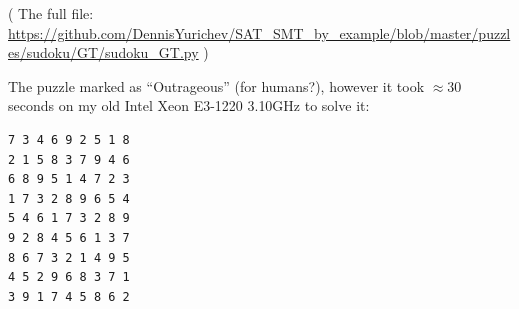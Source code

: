 ( The full file: \url{https://github.com/DennisYurichev/SAT_SMT_by_example/blob/master/puzzles/sudoku/GT/sudoku_GT.py} )

The puzzle marked as ``Outrageous'' (for humans?), however it took $\approx 30$ seconds
on my old Intel Xeon E3-1220 3.10GHz to solve it:

\begin{lstlisting}
7 3 4 6 9 2 5 1 8
2 1 5 8 3 7 9 4 6
6 8 9 5 1 4 7 2 3
1 7 3 2 8 9 6 5 4
5 4 6 1 7 3 2 8 9
9 2 8 4 5 6 1 3 7
8 6 7 3 2 1 4 9 5
4 5 2 9 6 8 3 7 1
3 9 1 7 4 5 8 6 2
\end{lstlisting}

